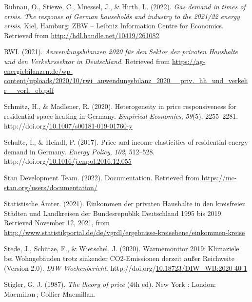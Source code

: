 \documentclass[12pt,twoside]{reedthesis}
\newlength{\cslhangindent}
\newenvironment{CSLReferences}[2] %
 {%
  \setlength{\parindent}{0pt}
  \ifodd #1 \everypar{\setlength{\hangindent}{\cslhangindent}}\ignorespaces\fi
  \ifnum #2 > 0
  \setlength{\parskip}{#2\baselineskip}
  \fi
 }%
 {}
\begin{document}
\begin{CSLReferences}{1}{0}
\leavevmode{}%
Ruhnau, O., Stiewe, C., Muessel, J., \& Hirth, L. (2022). \emph{Gas demand in times of crisis. The response of German households and industry to the 2021/22 energy crisis}. Kiel, Hamburg: ZBW -- Leibniz Information Centre for Economics. Retrieved from \url{http://hdl.handle.net/10419/261082}

\leavevmode{}%
RWI. (2021). \emph{Anwendungsbilanzen 2020 für den Sektor der privaten Haushalte und den Verkehrssektor in Deutschland}. Retrieved from \url{https://ag-energiebilanzen.de/wp-content/uploads/2020/10/rwi_anwendungsbilanz_2020__priv._hh_und_verkehr__vorl._eb.pdf}

\leavevmode{}%
Schmitz, H., \& Madlener, R. (2020). Heterogeneity in price responsiveness for residential space heating in Germany. \emph{Empirical Economics}, \emph{59}(5), 2255--2281. http://doi.org/\href{https://doi.org/10.1007/s00181-019-01760-y}{10.1007/s00181-019-01760-y}

\leavevmode{}%
Schulte, I., \& Heindl, P. (2017). Price and income elasticities of residential energy demand in Germany. \emph{Energy Policy}, \emph{102}, 512--528. http://doi.org/\href{https://doi.org/10.1016/j.enpol.2016.12.055}{10.1016/j.enpol.2016.12.055}

\leavevmode{}%
Stan Development Team. (2022). Documentation. Retrieved from \url{https://mc-stan.org/users/documentation/}

\leavevmode{}%
Statistische Ämter. (2021). Einkommen der privaten Haushalte in den kreisfreien Städten und Landkreisen der Bundesrepublik Deutschland 1995 bis 2019. Retrieved November 12, 2021, from \url{http://www.statistikportal.de/de/vgrdl/ergebnisse-kreisebene/einkommen-kreise}

\leavevmode{}%
Stede, J., Schütze, F., \& Wietschel, J. (2020). Wärmemonitor 2019: Klimaziele bei Wohngebäuden trotz sinkender CO2-Emissionen derzeit außer Reichweite (Version 2.0). \emph{DIW Wochenbericht}. http://doi.org/\href{https://doi.org/10.18723/DIW_WB:2020-40-1}{10.18723/DIW\_WB:2020-40-1}

\leavevmode{}%
Stigler, G. J. (1987). \emph{The theory of price} (4th ed). New York : London: Macmillan\,; Collier Macmillan.


\end{CSLReferences}
\end{document}
